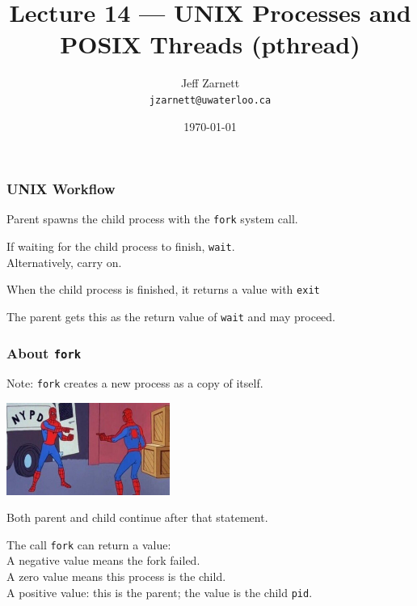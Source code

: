

\title{Lecture 14 --- UNIX Processes and POSIX Threads (pthread) }

\author{Jeff Zarnett \\ \small \texttt{jzarnett@uwaterloo.ca}}
\date{\today}




\begin{frame}
	\titlepage

\end{frame}


\begin{frame}
	\frametitle{UNIX Workflow}

	Parent spawns the child process with the \texttt{fork} system call.

	If waiting for the child process to finish, \texttt{wait}.\\
	\quad Alternatively, carry on.

	When the child process is finished, it returns a value with \texttt{exit}

	The parent gets this as the return value of \texttt{wait} and may proceed.
\end{frame}

\begin{frame}
	\frametitle{About \texttt{fork}}

	Note: \texttt{fork} creates a new process as a copy of itself.

	\begin{center}
		\includegraphics[width=0.4\textwidth]{images/spiderman-2.jpg}
	\end{center}

	Both parent and child continue after that statement.

	The call \texttt{fork} can return a value:\\
	\quad A negative value means the fork failed.\\
	\quad A zero value means this process is the child.\\
	\quad A positive value: this is the parent; the value is the child \texttt{pid}.

\end{frame}

